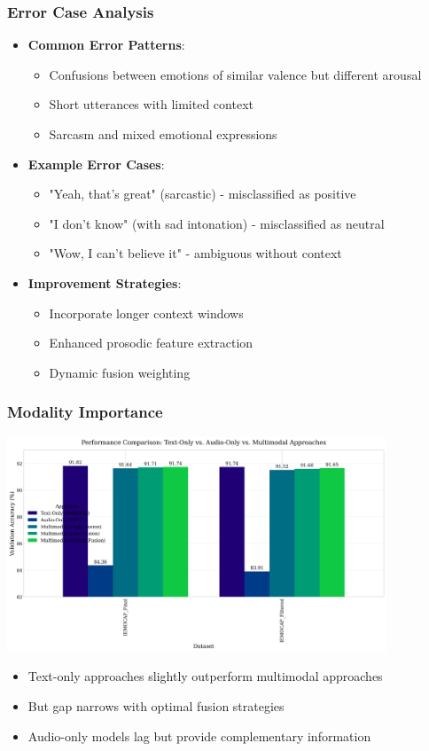 \begin{frame}
\frametitle{Error Case Analysis}
\begin{itemize}
    \item \textbf{Common Error Patterns}:
    \begin{itemize}
        \item Confusions between emotions of similar valence but different arousal
        \item Short utterances with limited context
        \item Sarcasm and mixed emotional expressions
    \end{itemize}
    \item \textbf{Example Error Cases}:
    \begin{itemize}
        \item "Yeah, that's great" (sarcastic) - misclassified as positive
        \item "I don't know" (with sad intonation) - misclassified as neutral
        \item "Wow, I can't believe it" - ambiguous without context
    \end{itemize}
    \item \textbf{Improvement Strategies}:
    \begin{itemize}
        \item Incorporate longer context windows
        \item Enhanced prosodic feature extraction
        \item Dynamic fusion weighting
    \end{itemize}
\end{itemize}
\end{frame}

\begin{frame}
\frametitle{Modality Importance}
\begin{center}
\includegraphics[width=0.85\textwidth]{figures/modality_comparison.png}
\end{center}

\begin{itemize}
    \item Text-only approaches slightly outperform multimodal approaches
    \item But gap narrows with optimal fusion strategies
    \item Audio-only models lag but provide complementary information
\end{itemize}
\end{frame}

